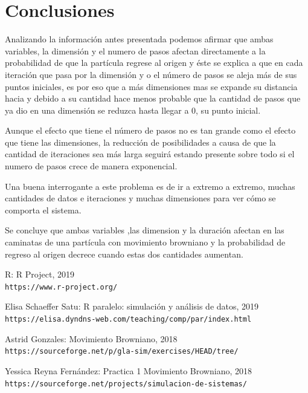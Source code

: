 \documentclass{article}
\begin{document}
\section{Conclusiones}

Analizando la información antes presentada podemos afirmar que ambas variables, la dimensión y el numero de pasos afectan directamente a la probabilidad de que la partícula regrese al origen y éste se explica a que en cada iteración que pasa por la dimensión y o el número de pasos se aleja  más de sus puntos iniciales, es por eso que a más dimensiones mas se expande su distancia hacia y debido a su cantidad hace menos probable que la cantidad de pasos que ya dio en una dimensión se reduzca hasta llegar a 0, su punto inicial.

Aunque el efecto que tiene el número de pasos no es tan grande como el efecto que tiene las dimensiones, la reducción de posibilidades a causa de que la cantidad de iteraciones sea más larga seguirá estando presente sobre todo si el numero de pasos crece de manera exponencial.

Una buena interrogante a este problema es de ir a extremo a extremo, muchas cantidades de datos e iteraciones y muchas dimensiones para ver cómo se comporta el sistema.

Se concluye que ambas variables  ,las dimension y la duración afectan en las caminatas de una partícula con movimiento browniano y la probabilidad de regreso al origen decrece cuando estas dos cantidades aumentan.

\medskip

\begin{thebibliography}{9}

R:  R Project, 2019
\\\texttt{https://www.r-project.org/}

Elisa Schaeffer Satu: R paralelo: simulación y análisis de datos, 2019
\\\texttt{https://elisa.dyndns-web.com/teaching/comp/par/index.html}
 

Astrid Gonzales: Movimiento Browniano, 2018
\\\texttt{https://sourceforge.net/p/gla-sim/exercises/HEAD/tree/}


Yessica Reyna Fernández: Practica 1 Movimiento Browniano, 2018
\\\texttt{https://sourceforge.net/projects/simulacion-de-sistemas/}

\end{thebibliography}
\end{document}

